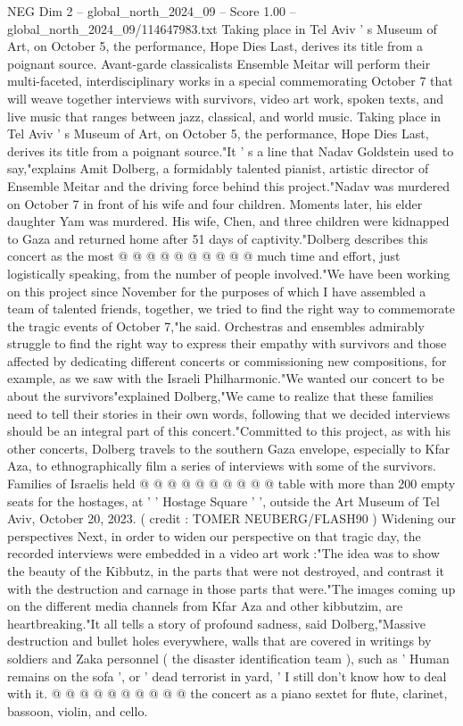 \begin{textsample}{NEG Dim 2 – global\_north\_2024\_09 – Score 1.00 – global\_north\_2024\_09/114647983.txt}  \label{ex:f2_neg_323}
Taking place in Tel Aviv ' s Museum of Art, on October 5, the performance, Hope Dies Last, derives its title from a poignant source.
Avant-garde classicalists Ensemble Meitar will perform their multi-faceted, interdisciplinary works in a special commemorating October 7 that will weave together interviews with survivors, video art work, spoken texts, and live music that ranges between jazz, classical, and world music.
Taking place in Tel Aviv ' s Museum of Art, on October 5, the performance, Hope Dies Last, derives its title from a poignant source."It ' s a line that Nadav Goldstein used to say,"explains Amit Dolberg, a formidably talented pianist, artistic director of Ensemble Meitar and the driving force behind this project."Nadav was murdered on October 7 in front of his wife and four children.
Moments later, his elder daughter Yam was murdered.
His wife, Chen, and three children were kidnapped to Gaza and returned home after 51 days of captivity."Dolberg describes this concert as the most @ @ @ @ @ @ @ @ @ @ much time and effort, just logistically speaking, from the number of people involved."We have been working on this project since November for the purposes of which I have assembled a team of talented friends, together, we tried to find the right way to commemorate the tragic events of October 7,"he said.
Orchestras and ensembles admirably struggle to find the right way to express their empathy with survivors and those affected by dedicating different concerts or commissioning new compositions, for example, as we saw with the Israeli Philharmonic."We wanted our concert to be about the survivors"explained Dolberg,"We came to realize that these families need to tell their stories in their own words, following that we decided interviews should be an integral part of this concert."Committed to this project, as with his other concerts, Dolberg travels to the southern Gaza envelope, especially to Kfar Aza, to ethnographically film a series of interviews with some of the survivors.
Families of Israelis held @ @ @ @ @ @ @ @ @ @ table with more than 200 empty seats for the hostages, at ' ' Hostage Square ' ', outside the Art Museum of Tel Aviv, October 20, 2023. ( credit : TOMER NEUBERG/FLASH90 ) Widening our perspectives Next, in order to widen our perspective on that tragic day, the recorded interviews were embedded in a video art work :"The idea was to show the beauty of the Kibbutz, in the parts that were not destroyed, and contrast it with the destruction and carnage in those parts that were."The images coming up on the different media channels from Kfar Aza and other kibbutzim, are heartbreaking."It all tells a story of profound sadness, said Dolberg,"Massive destruction and bullet holes everywhere, walls that are covered in writings by soldiers and Zaka personnel ( the disaster identification team ), such as ' Human remains on the sofa ', or ' dead terrorist in yard, ' I still don't know how to deal with it. @ @ @ @ @ @ @ @ @ @ the concert as a piano sextet for flute, clarinet, bassoon, violin, and cello.

\end{textsample}
